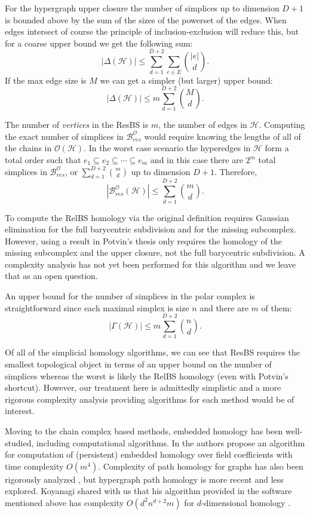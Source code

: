 \documentclass{amsart}
\renewcommand{\H}{\mathcal{H}}
\newcommand{\bary}{\mathcal{B}}
\newcommand{\ECP}{\mathcal{O}}
\begin{document}
For the hypergraph upper closure the number of simplices up to dimension $D+1$ is bounded above by the sum of the sizes of the powerset of the edges. When edges intersect of course the principle of inclusion-exclusion will reduce this, but for a coarse upper bound we get the following sum:
\[|\Delta(\H)| \leq \sum_{d=1}^{D+2} \sum_{e \in E} {|e| \choose d}.\]
If the max edge size is $M$ we can get a simpler (but larger) upper bound:
\[|\Delta(\H)| \leq m\sum_{d=1}^{D+2} {M \choose d}.\]

The number of \emph{vertices} in the ResBS is $m$, the number of edges in $\H$. Computing the exact number of simplices in $\bary^\ECP_{res}$ would require knowing the lengths of all of the chains in $\ECP(\H)$. 
In the worst case scenario the hyperedges in $\H$ form a total order such that $e_1 \subseteq e_2 \subseteq \cdots \subseteq e_m$ and in this case there are $2^m$ total simplices in $\bary^\ECP_{res}$, or $\sum_{d=1}^{D+2} {m \choose d}$ up to dimension $D+1$.
Therefore, 
\[|\bary^\ECP_{res}(\H)| \leq \sum_{d=1}^{D+2} {m \choose d}.\]

To compute the RelBS homology via the original definition requires Gaussian elimination for the full barycentric subdivision and for the missing subcomplex. 
However, using a result in Potvin's thesis \cite[Theorem 5.2.3]{potvin2023hypergraphs} only requires the homology of the missing subcomplex and the upper closure, not the full barycentric subdivision.
A complexity analysis has not yet been performed for this algorithm and we leave that as an open question.

An upper bound for the number of simplices in the polar complex is straightforward since each maximal simplex is size $n$ and there are $m$ of them:
\[|\Gamma(\H)| \leq m\sum_{d=1}^{D+2} {n \choose d}. \]

Of all of the simplicial homology algorithms, we can see that ResBS requires the smallest topological object in terms of an upper bound on the number of simplices whereas the worst is likely the RelBS homology (even with Potvin's shortcut). 
However, our treatment here is admittedly simplistic and a more rigorous complexity analysis providing algorithms for each method would be of interest.

Moving to the chain complex based methods, embedded homology has been well-studied, including computational algorithms. In \cite{liu2024computing} the authors propose an algorithm for computation of (persistent) embedded homology over field coefficients with time complexity $O(m^4)$.
Complexity of path homology for graphs has also been rigorously analyzed \cite{chowdhury_persistent_2018,dey2022efficient}, but hypergraph path homology is more recent and less explored. 
Koyanagi shared with us that his algorithm provided in the software mentioned above has complexity $O(d^2 n^{d+2} m)$ for $d$-dimensional homology \cite{koyanagi2025personal}.
\end{document}

